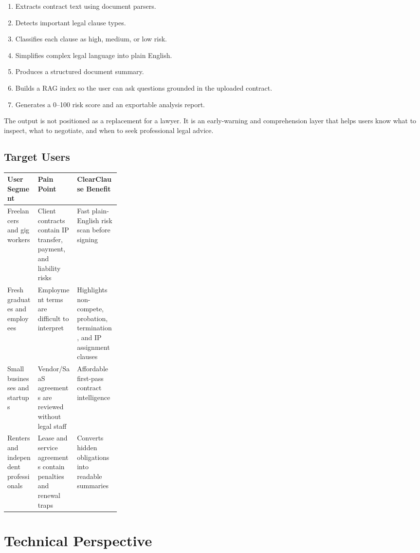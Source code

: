 \documentclass[11pt,a4paper]{article}
\begin{document}
\begin{enumerate}
\item Extracts contract text using document parsers.
\item Detects important legal clause types.
\item Classifies each clause as high, medium, or low risk.
\item Simplifies complex legal language into plain English.
\item Produces a structured document summary.
\item Builds a RAG index so the user can ask questions grounded in the uploaded contract.
\item Generates a 0--100 risk score and an exportable analysis report.
\end{enumerate}

The output is not positioned as a replacement for a lawyer. It is an early-warning and comprehension layer that helps users know what to inspect, what to negotiate, and when to seek professional legal advice.

\subsection{Target Users}

\begin{tabularx}{\linewidth}{L{0.27\linewidth}Y Y}
\toprule
\textbf{User Segment} & \textbf{Pain Point} & \textbf{ClearClause Benefit} \\
\midrule
Freelancers and gig workers & Client contracts contain IP transfer, payment, and liability risks & Fast plain-English risk scan before signing \\
Fresh graduates and employees & Employment terms are difficult to interpret & Highlights non-compete, probation, termination, and IP assignment clauses \\
Small businesses and startups & Vendor/SaaS agreements are reviewed without legal staff & Affordable first-pass contract intelligence \\
Renters and independent professionals & Lease and service agreements contain penalties and renewal traps & Converts hidden obligations into readable summaries \\
\bottomrule
\end{tabularx}

\section{Technical Perspective}
\end{document}
